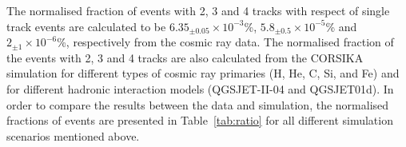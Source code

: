 \documentclass[a4paper,12pt,twoside]{article}
\begin{document}
The normalised fraction of events with 2, 3 and 4 tracks with respect of single track events are calculated to be \mbox{$6.35_{\pm0.05}\times 10^{-3}$\%}, \mbox{$5.8_{\pm0.5}\times 10^{-5}$\%} and \mbox{$2_{\pm1}\times 10^{-6}$\%}, respectively from the cosmic ray data. The normalised fraction of the events with 2, 3 and 4 tracks are also calculated from the CORSIKA simulation for different types of cosmic ray primaries (H, He, C, Si, and Fe) and for different hadronic interaction models (QGSJET-II-04 and QGSJET01d). In order to compare the results between the data and simulation, the normalised fractions of events are presented in Table~\ref{tab:ratio} for all different simulation scenarios mentioned above.
\begin{table}[]
  \centering
\end{table}
\end{document}
